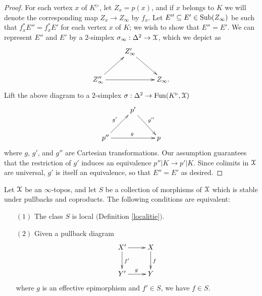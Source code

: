 \begin{proof}
For each vertex $x$ of $K^{\triangleright}$, let $Z_x =p(x)$, and if $x$ belongs to $K$ we will 
denote the corresponding map $Z_{x} \rightarrow Z_{\infty}$ by $f_{x}$.
Let $E'' \subseteq E' \in \operatorname{Sub}(Z_{\infty})$ be such that
$f_{x}^{\ast}E'' = f_{x}^{\ast} E'$ for each vertex $x$ of $K$; we wish to show that $E'' = E'$. 
We can represent $E''$ and $E'$ by a $2$-simplex $\sigma_{\infty}: \Delta^2 \rightarrow \operatorname{\mathcal{X}}$, which we depict as
$$ \xymatrix{ & Z'_{\infty} \ar[dr] & \\ 
Z''_{\infty} \ar[ur] \ar[rr] & & Z_{\infty}. }$$
Lift the above diagram to a $2$-simplex $\sigma: \Delta^2 \rightarrow 
\operatorname{Fun}( K^{\triangleright}, \operatorname{\mathcal{X}})$
$$ \xymatrix{ & p' \ar[dr]^{g''} & \\
p'' \ar[ur]^{g'} \ar[rr]^{g} & & p }$$
where $g$, $g'$, and $g''$ are Cartesian transformations. Our assumption guarantees that
the restriction of $g'$ induces an equivalence $p'' | K \rightarrow p' | K$. Since colimits in
$\operatorname{\mathcal{X}}$ are universal, $g'$ is itself an equivalence, so that $E'' = E'$ as desired.
\end{proof}

\begin{proposition}\label{torque}
Let $\operatorname{\mathcal{X}}$ be an $\infty$-topos, and let $S$ be a collection of morphisms of $\operatorname{\mathcal{X}}$ which is stable under pullbacks and coproducts. The following conditions are equivalent:
\begin{itemize}
\item[$(1)$] The class $S$ is local $($Definition \ref{localitie}$)$. 

\item[$(2)$] Given a pullback diagram
$$ \xymatrix{ X' \ar[r] \ar[d]^{f'} & X \ar[d]^{f} \\
Y' \ar[r]^{g} & Y }$$
where $g$ is an effective epimorphism and $f' \in S$, we have $f \in S$.
\end{itemize}
\end{proposition}

